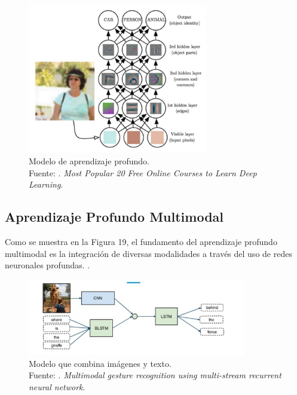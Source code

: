 \begin{figure}[!ht]
	\begin{center}
		\includegraphics[width=0.70\textwidth]{2/figures/deeplearning_machinelearning2.jpg}
		\caption[Modelo de aprendizaje profundo]{Modelo de aprendizaje profundo.\\
		Fuente: \cite{tec_cook2018deeplearning}. \textit{Most Popular 20 Free Online Courses to Learn Deep Learning}.}
		\label{2:fig6}
	\end{center}
\end{figure}


\subsection{Aprendizaje Profundo Multimodal}
Como se muestra en la Figura 19, el fundamento del aprendizaje profundo multimodal es la integración de diversas modalidades a través del uso de redes neuronales profundas. \parencite{bk_deng2018deeplearningnlp}.

\begin{figure}[!ht]
	\begin{center}
		\includegraphics[width=0.85\textwidth]{2/figures/multimodal_network.png}
		\caption[Modelo que combina imágenes y texto]{Modelo que combina imágenes y texto.\\
		Fuente: \cite{tec_nishida2015multimodal}. \textit{Multimodal gesture recognition using multi-stream recurrent neural network}.}
		\label{2:fig7}
	\end{center}
\end{figure}

